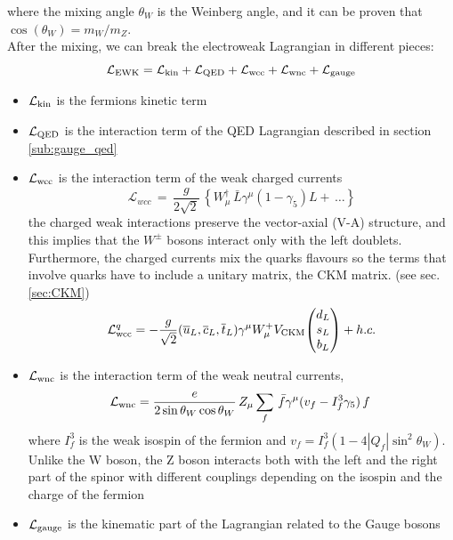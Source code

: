 where the mixing angle $\theta_W$ is the Weinberg angle, and it can be proven that $\cos(\theta_W)=m_W/m_Z$.\\
After the mixing, we can break the electroweak Lagrangian in different pieces:
\begin{equation}\label{eq:EWK}
    \mathcal{L}_\text{EWK}=\mathcal{L}_\text{kin}+\mathcal{L}_\text{QED}+\mathcal{L}_\text{wcc}+\mathcal{L}_\text{wnc}+\mathcal{L}_\text{gauge}
\end{equation}

\begin{itemize}
    \item  $\mathcal{L}_\text{kin}$ is the fermions kinetic term
    \item $\mathcal{L}_\text{QED}$ is the interaction term of the QED Lagrangian described in section \ref{sub:gauge_qed}
    \item $\mathcal{L}_\text{wcc}$ is the interaction term of the weak charged currents
    \begin{equation}
        {\mathcal{L}}_{wcc}\,=\,\frac{g}{2{\sqrt{2}}}\,\left\{W_{\mu}^{\dagger}\,\bar{L}\gamma^{\mu}(1-\gamma_{5})L+\,\dots \right\}
    \end{equation}
    the charged weak interactions preserve the vector-axial (V-A) structure, and this implies that the $W^\pm$ bosons interact only with the left doublets.\\
    Furthermore, the charged currents mix the quarks flavours so the terms that involve quarks have to include a unitary matrix, the CKM matrix. (see sec.\ref{sec:CKM})
    \begin{equation}
        \Lg{wcc}^q=-\frac{g}{\sqrt{2}}(\overline{{{u}}}_{L},\overline{{{c}}}_{L},\overline{{{t}}}_{L})\gamma^{\mu}W_{\mu}^{+}V_{\mathrm{CKM}}\tb{d_{L}}{s_{L}}{b_L}+h.c.
    \end{equation}
    \item $\mathcal{L}_\text{wnc}$ is the interaction term of the weak neutral currents,
    \begin{equation}
        \mathcal{L}_\text{wnc}=\frac{e}{2\sin\theta_{W}\cos\theta_{W}}\,Z_{\mu}\sum_{f}\,\bar{f}\gamma^{\mu}(v_{f}-I^3_{f}\gamma_{5})\,f\;
    \end{equation}
    where $I^3_f$ is the weak isospin of the fermion and $v_f=I^{3}_{f}\left(1-4|Q_{f}|\sin^{2}\theta_{W}\right)$.
    Unlike the W boson, the Z boson interacts both with the left and the right part of the spinor with different couplings depending on the isospin and the charge of the fermion 
    \item $\mathcal{L}_\text{gauge}$ is the kinematic part of the Lagrangian related to the Gauge bosons
\end{itemize}


